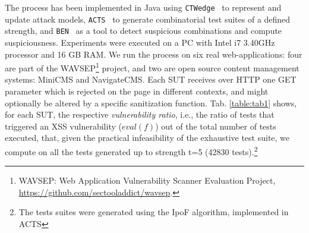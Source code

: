 \begin{tikzborder}{\cite{Gargantini16:validation}}
\begin{tikzborder}{\cite{gargantini_combinatorial_2017}}
\begin{tikzborder}{\cite{garn2019}}
\bb The process has been implemented in Java using {\tt CTWedge}~\cite{IWCTGargantini2018} to represent and update attack models, {\tt ACTS}~\cite{ACTS} to generate combinatorial test suites of a defined strength, and {\tt BEN}~\cite{ghandehari2018combinatorial} as a tool to detect suspicious combinations and compute suspiciousness.
Experiments were executed on a PC with Intel i7 3.40GHz processor and 16 GB RAM.
We run the process on six real web-applications: four are part of the WAVSEP\footnote{WAVSEP: Web Application Vulnerability Scanner Evaluation Project, \url{https://github.com/sectooladdict/wavsep}.} project, and two are open source content management systems: MiniCMS and NavigateCMS.
Each SUT receives over HTTP one GET parameter which is rejected on the page in different contexts, and might optionally be altered by a specific sanitization function.
Tab. \ref{table:tab1} shows, for each SUT, the respective \textit{vulnerability ratio}, i.e., the ratio of tests that triggered an XSS vulnerability ($\mathit{eval}(f)$) out of the total number of tests executed, that, given the practical infeasibility of the exhaustive test suite, we compute on all the tests generated up to strength t=5 %
(42830 tests).\footnote{The tests suites were generated using the IpoF algorithm, implemented in ACTS}\be
\begin{table}[ht]
\centering
\caption{XSS reflection sites on WAVSEP benchmarks}\label{table:tab1}
\end{table}


\end{tikzborder}
\end{tikzborder}
\end{tikzborder}

